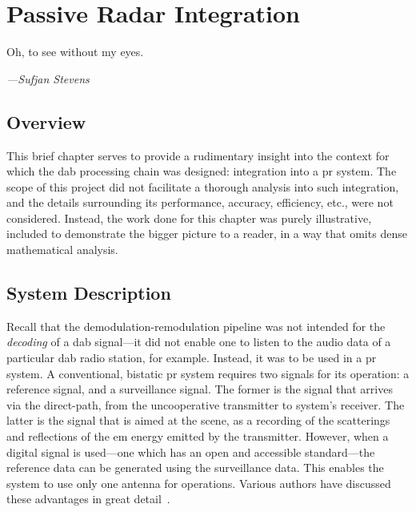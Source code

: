 \documentclass[class=report,11pt,crop=false]{standalone}
\begin{document}
\chapter{Passive Radar Integration}
\epigraph{Oh, to see without my eyes.}%
    {\emph{---Sufjan Stevens}}

\section{Overview}
This brief chapter serves to provide a rudimentary insight into the context for which the \gls{dab} processing chain was designed: integration into a \gls{pr} system. The scope of this project did not facilitate a thorough analysis into such integration, and the details surrounding its performance, accuracy, efficiency, etc., were not considered. Instead, the work done for this chapter was purely illustrative, included to demonstrate the bigger picture to a reader, in a way that omits dense mathematical analysis. 

\section{System Description}
Recall that the demodulation-remodulation pipeline was not intended for the \emph{decoding} of a \gls{dab} signal---it did not enable one to listen to the audio data of a particular \gls{dab} radio station, for example. Instead, it was to be used in a \gls{pr} system. A conventional, bistatic \gls{pr} system requires two signals for its operation: a reference signal, and a surveillance signal. The former is the signal that arrives via the direct-path, from the uncooperative transmitter to system's receiver. The latter is the signal that is aimed at the scene, as a recording of the scatterings and reflections of the \gls{em} energy emitted by the transmitter. However, when a digital signal is used---one which has an open and accessible standard---the reference data can be generated using the surveillance data. This enables the system to use only one antenna for operations. Various authors have discussed these advantages in great detail~\cite{Fang2018,Barott2014}.
\end{document}
